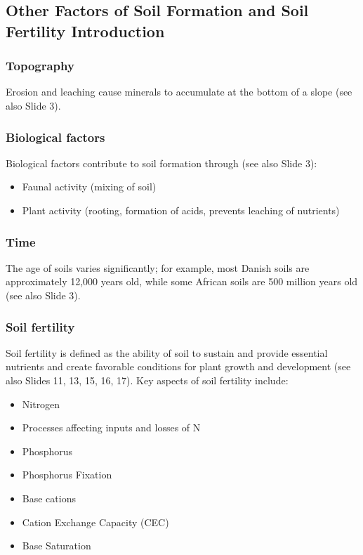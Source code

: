 \subsection{Other Factors of Soil Formation and Soil Fertility Introduction} 
\subsubsection*{Topography} 
Erosion and leaching cause minerals to accumulate at the bottom of a slope (see also Slide 3).

\subsubsection*{Biological factors} 
Biological factors contribute to soil formation through (see also Slide 3): 

\begin{itemize} 
    \item Faunal activity (mixing of soil) 
    \item Plant activity (rooting, formation of acids, prevents leaching of nutrients) 
\end{itemize}

\subsubsection*{Time} 
The age of soils varies significantly; for example, most Danish soils are approximately 12,000 years old, while some African soils are 500 million years old (see also Slide 3).

\subsubsection*{Soil fertility} 
Soil fertility is defined as the ability of soil to sustain and provide essential nutrients and create favorable conditions for plant growth and development (see also Slides 11, 13, 15, 16, 17). Key aspects of soil fertility include:
\begin{itemize} 
    \item Nitrogen 
    \item Processes affecting inputs and losses of N 
    \item Phosphorus 
    \item Phosphorus Fixation 
    \item Base cations 
    \item Cation Exchange Capacity (CEC) 
    \item Base Saturation 
\end{itemize}

